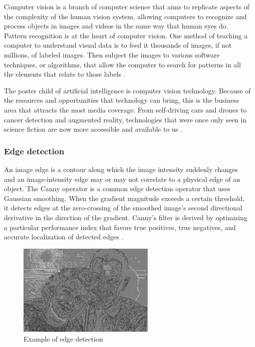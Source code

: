 Computer vision is a branch of computer science that aims to replicate aspects of the complexity of the human vision system, allowing computers to recognize and process objects in images and videos in the same way that human eyes do. Pattern recognition is at the heart of computer vision. One method of teaching a computer to understand visual data is to feed it thousands of images, if not millions, of labeled images. Then subject the images to various software techniques, or algorithms, that allow the computer to search for patterns in all the elements that relate to those labels \cite{mihajlovic_everything_nodate}.

The poster child of artificial intelligence is computer vision technology. Because of the resources and opportunities that technology can bring, this is the business area that attracts the most media coverage. From self-driving cars and drones to cancer detection and augmented reality, technologies that were once only seen in science fiction are now more accessible and available to us \cite{ambalina_5_2020}.




\subsubsection*{Edge detection} 
An image edge is a contour along which the image intensity suddenly changes and an image-intensity edge may or may not correlate to a physical edge of an object. The Canny operator is a common edge detection operator that uses Gaussian smoothing. When the gradient magnitude exceeds a certain threshold, it detects edges at the zero-crossing of the smoothed image's second directional derivative in the direction of the gradient. Canny's filter is derived by optimizing a particular performance index that favors true positives, true negatives, and accurate localization of detected edges \cite{nalwa_edge_1993}.

\begin{figure}[ht]
    \centering
    \includegraphics[width=0.6\textwidth]{graphics/compc.PNG}
    \caption{Example of edge detection \cite{nalwa_edge_1993}}
    \label{fig:edgedetection}
\end{figure}

